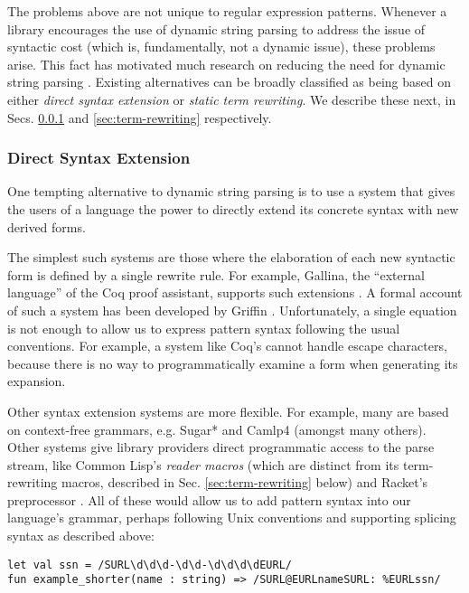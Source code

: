 The problems above are not unique to regular expression patterns. Whenever a library encourages the use of dynamic string parsing to address the issue of syntactic cost (which is, fundamentally, not a dynamic issue), these problems arise. %
	This fact has motivated much research on reducing the need for dynamic string parsing \cite{Bravenboer:2007:PIA:1289971.1289975}. Existing alternatives can be broadly classified as being based on either \emph{direct syntax extension} or \emph{static term rewriting}. We describe these next, in Secs. \ref{sec:syntax-extension} and \ref{sec:term-rewriting} respectively.%

\subsubsection{Direct Syntax Extension}\label{sec:syntax-extension}
One tempting alternative to dynamic string parsing is to use a system that gives the users of a language the power to directly extend its concrete syntax with new derived forms. %

The simplest such systems are those where the elaboration of each new syntactic form is defined by a single rewrite rule. For example, Gallina, the ``external language'' of the Coq proof assistant, supports such extensions \cite{Coq:manual}. A formal account of such a system has been developed by Griffin \cite{5134}. Unfortunately, a single equation is not enough to allow us to express pattern syntax following the usual conventions. For example, a system like Coq's cannot handle escape characters, because there is no way to programmatically examine a form when generating its expansion.

Other syntax extension systems are more flexible. For example, many are based on context-free grammars, e.g.  Sugar* \cite{erdweg2013framework} and Camlp4 \cite{ocaml-manual} (amongst many others). Other systems give library providers direct programmatic access to the parse stream, like Common Lisp's \emph{reader macros} \cite{steele1990common} (which are distinct from its term-rewriting macros, described in Sec. \ref{sec:term-rewriting} below) and Racket's preprocessor \cite{Flatt:2012:CLR:2063176.2063195}. All of these would allow us to add pattern syntax into our language's grammar, perhaps following Unix conventions and supporting splicing syntax as described above:
\begin{lstlisting}[numbers=none]
let val ssn = /SURL\d\d\d-\d\d-\d\d\d\dEURL/
fun example_shorter(name : string) => /SURL@EURLnameSURL: %EURLssn/
\end{lstlisting}

